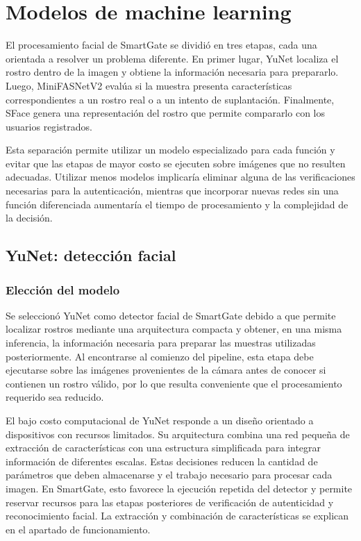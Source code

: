 \chapter{Modelos de machine learning}
\label{cap:modelos}

El procesamiento facial de SmartGate se dividió en tres etapas, cada una orientada a resolver un problema diferente. En primer lugar, YuNet localiza el rostro dentro de la imagen y obtiene la información necesaria para prepararlo. Luego, MiniFASNetV2 evalúa si la muestra presenta características correspondientes a un rostro real o a un intento de suplantación. Finalmente, SFace genera una representación del rostro que permite compararlo con los usuarios registrados.

Esta separación permite utilizar un modelo especializado para cada función y evitar que las etapas de mayor costo se ejecuten sobre imágenes que no resulten adecuadas. Utilizar menos modelos implicaría eliminar alguna de las verificaciones necesarias para la autenticación, mientras que incorporar nuevas redes sin una función diferenciada aumentaría el tiempo de procesamiento y la complejidad de la decisión.

\section{YuNet: detección facial}

\subsection{Elección del modelo}

Se seleccionó YuNet como detector facial de SmartGate debido a que permite localizar rostros mediante una arquitectura compacta y obtener, en una misma inferencia, la información necesaria para preparar las muestras utilizadas posteriormente. Al encontrarse al comienzo del pipeline, esta etapa debe ejecutarse sobre las imágenes provenientes de la cámara antes de conocer si contienen un rostro válido, por lo que resulta conveniente que el procesamiento requerido sea reducido.

El bajo costo computacional de YuNet responde a un diseño orientado a dispositivos con recursos limitados. Su arquitectura combina una red pequeña de extracción de características con una estructura simplificada para integrar información de diferentes escalas. Estas decisiones reducen la cantidad de parámetros que deben almacenarse y el trabajo necesario para procesar cada imagen. En SmartGate, esto favorece la ejecución repetida del detector y permite reservar recursos para las etapas posteriores de verificación de autenticidad y reconocimiento facial. La extracción y combinación de características se explican en el apartado de funcionamiento.

